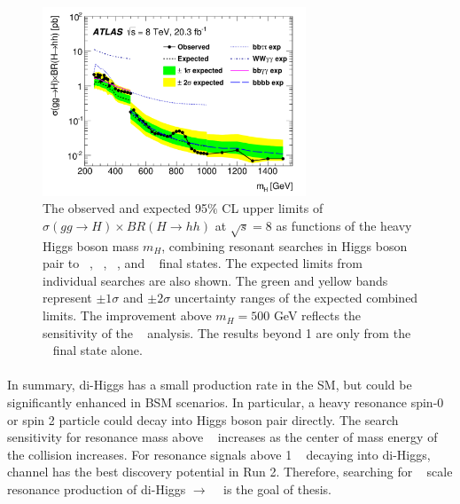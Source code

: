 \begin{figure}[h!]
  \centering
  \includegraphics[width=0.7\textwidth]{figures/theory/Run1_ATLAS}
  \caption{The observed and expected 95$\%$ CL upper limits of $\sigma(gg \to H) \times BR(H \to hh)$ at $\sqrt{s}=8$ \TeV as functions of the heavy Higgs boson mass $m_{H}$, combining resonant searches in Higgs boson pair to \bbtautau~, \WWgg~, \bbgg~, and \bbbb~ final states. The expected limits from individual searches are also shown. The green and yellow bands represent $\pm 1\sigma$ and $\pm 2\sigma$ uncertainty ranges of the expected combined limits. The improvement above $m_{H} =500$ GeV reflects the sensitivity of the \bbbb~ analysis. The results beyond 1 \TeV are only from the \bbbb~ final state alone.}
  \label{fig:Run1_ATLAS}
\end{figure}

\paragraph{}
In summary, di-Higgs has a small production rate in the SM, but could be significantly enhanced in BSM scenarios. In particular, a heavy resonance spin-0 or spin 2 particle could decay into Higgs boson pair directly. The search sensitivity for resonance mass above \TeV~ increases as the center of mass energy of the collision increases. For resonance signals above 1 \TeV~ decaying into di-Higgs, \bbbb~ channel has the best discovery potential in Run 2. Therefore, searching for \TeV~ scale resonance production of di-Higgs $\to$ \bbbb~ is the goal of thesis.


